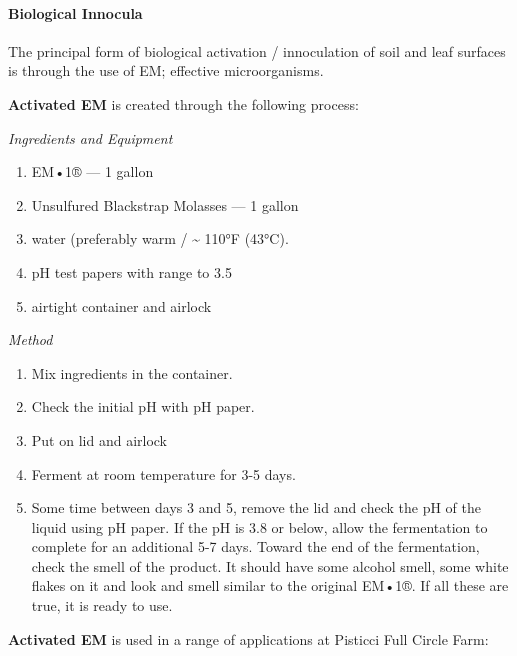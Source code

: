 \paragraph{Biological Innocula}\label{biological-innocula}

The principal form of biological activation / innoculation of soil and
leaf surfaces is through the use of EM; effective microorganisms.

\textbf{Activated EM} is created through the following process:

\emph{Ingredients and Equipment}

\begin{enumerate}
\def\labelenumi{\arabic{enumi}.}
\itemsep1pt\parskip0pt
\item
  EM•1® --- 1 gallon
\item
  Unsulfured Blackstrap Molasses --- 1 gallon
\item
  water (preferably warm / \textasciitilde{} 110°F (43°C).
\item
  pH test papers with range to 3.5
\item
  airtight container and airlock
\end{enumerate}

\emph{Method}

\begin{enumerate}
\def\labelenumi{\arabic{enumi}.}
\itemsep1pt\parskip0pt
\item
  Mix ingredients in the container.
\item
  Check the initial pH with pH paper.
\item
  Put on lid and airlock
\item
  Ferment at room temperature for 3-5 days.
\item
  Some time between days 3 and 5, remove the lid and check the pH of the
  liquid using pH paper. If the pH is 3.8 or below, allow the
  fermentation to complete for an additional 5-7 days. Toward the end of
  the fermentation, check the smell of the product. It should have some
  alcohol smell, some white flakes on it and look and smell similar to
  the original EM•1®. If all these are true, it is ready to use.
\end{enumerate}

\textbf{Activated EM} is used in a range of applications at Pisticci
Full Circle Farm:

